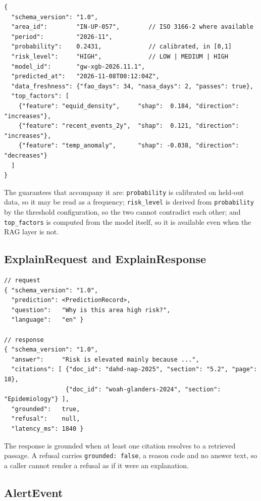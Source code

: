 \documentclass[10pt,openany]{report}
\begin{document}
\begin{verbatim}
{
  "schema_version": "1.0",
  "area_id":        "IN-UP-057",        // ISO 3166-2 where available
  "period":         "2026-11",
  "probability":    0.2431,             // calibrated, in [0,1]
  "risk_level":     "HIGH",             // LOW | MEDIUM | HIGH
  "model_id":       "gw-xgb-2026.11.1",
  "predicted_at":   "2026-11-08T00:12:04Z",
  "data_freshness": {"fao_days": 34, "nasa_days": 2, "passes": true},
  "top_factors": [
    {"feature": "equid_density",     "shap":  0.184, "direction": "increases"},
    {"feature": "recent_events_2y",  "shap":  0.121, "direction": "increases"},
    {"feature": "temp_anomaly",      "shap": -0.038, "direction": "decreases"}
  ]
}
\end{verbatim}

The guarantees that accompany it are: \texttt{probability} is calibrated on held-out data, so it
may be read as a frequency; \texttt{risk\_level} is derived from \texttt{probability} by the
threshold configuration, so the two cannot contradict each other; and \texttt{top\_factors} is
computed from the model itself, so it is available even when the RAG layer is not.

\subsection*{ExplainRequest and ExplainResponse}

\begin{verbatim}
// request
{ "schema_version": "1.0",
  "prediction": <PredictionRecord>,
  "question":   "Why is this area high risk?",
  "language":   "en" }

// response
{ "schema_version": "1.0",
  "answer":     "Risk is elevated mainly because ...",
  "citations": [ {"doc_id": "dahd-nap-2025", "section": "5.2", "page": 18},
                 {"doc_id": "woah-glanders-2024", "section": "Epidemiology"} ],
  "grounded":   true,
  "refusal":    null,
  "latency_ms": 1840 }
\end{verbatim}

The response is grounded when at least one citation resolves to a retrieved passage. A refusal
carries \texttt{grounded: false}, a reason code and no answer text, so a caller cannot render a
refusal as if it were an explanation.

\subsection*{AlertEvent}
\end{document}
